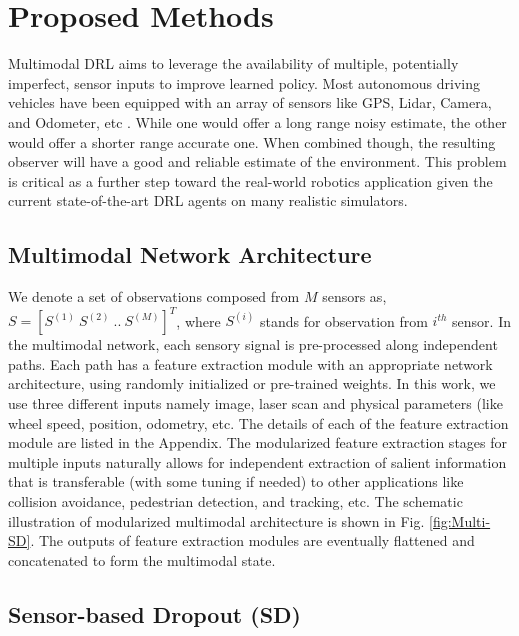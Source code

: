 \documentclass[../thesis.tex]{subfiles}
\begin{document}
 
\section{Proposed Methods} \label{sec:mdrl-proposed}
 
Multimodal DRL aims to leverage the availability of multiple, potentially imperfect, sensor inputs to improve learned policy. Most autonomous driving vehicles have been equipped with an array of sensors like GPS, Lidar, Camera, and Odometer, etc \cite{hudda2013self}. While one would offer a long range noisy estimate, the other would offer a shorter range accurate one. When combined though, the resulting observer will have a good and reliable estimate of the environment. This problem is critical as a further step toward the real-world robotics application given the current state-of-the-art DRL agents on many realistic simulators.
 
 
\subsection{Multimodal Network Architecture}
 
 
We denote a set of observations composed from $M$ sensors as, $S = [S^{(1)}~S^{(2)}~..~S^{(M)}]^T$, where $S^{(i)}$ stands for observation from $i^{th}$ sensor. In the multimodal network, each sensory signal is pre-processed along independent paths. Each path has a feature extraction module with an appropriate network architecture, using randomly initialized or pre-trained weights. In this work, we use three different inputs namely image, laser scan and physical parameters (like wheel speed, position, odometry, etc. The details of each of the feature extraction module are listed in the Appendix. The modularized feature extraction stages for multiple inputs naturally allows for independent extraction of salient information that is transferable (with some tuning if needed) to other applications like collision avoidance, pedestrian detection, and tracking, etc. The schematic illustration of modularized multimodal architecture is shown in Fig. \ref{fig:Multi-SD}. The outputs of feature extraction modules are eventually flattened and concatenated to form the multimodal state.
 
\subsection{Sensor-based Dropout (SD)} \label{sec:SD}
 
\end{document}
